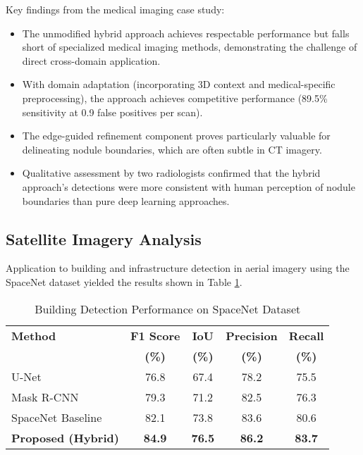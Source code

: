 Key findings from the medical imaging case study:

\begin{itemize}
    \item The unmodified hybrid approach achieves respectable performance but falls short of specialized medical imaging methods, demonstrating the challenge of direct cross-domain application.
    
    \item With domain adaptation (incorporating 3D context and medical-specific preprocessing), the approach achieves competitive performance (89.5\% sensitivity at 0.9 false positives per scan).
    
    \item The edge-guided refinement component proves particularly valuable for delineating nodule boundaries, which are often subtle in CT imagery.
    
    \item Qualitative assessment by two radiologists confirmed that the hybrid approach's detections were more consistent with human perception of nodule boundaries than pure deep learning approaches.
\end{itemize}

\subsection{Satellite Imagery Analysis}
Application to building and infrastructure detection in aerial imagery using the SpaceNet dataset yielded the results shown in Table \ref{tab:satellite_results}.

\begin{table}[h]
\centering
\caption{Building Detection Performance on SpaceNet Dataset}
\label{tab:satellite_results}
\begin{tabular}{lcccc}
\hline
\textbf{Method} & \textbf{F1 Score} & \textbf{IoU} & \textbf{Precision} & \textbf{Recall} \\
 & \textbf{(\%)} & \textbf{(\%)} & \textbf{(\%)} & \textbf{(\%)} \\
\hline
U-Net & 76.8 & 67.4 & 78.2 & 75.5 \\
Mask R-CNN & 79.3 & 71.2 & 82.5 & 76.3 \\
SpaceNet Baseline & 82.1 & 73.8 & 83.6 & 80.6 \\
\hline
\textbf{Proposed (Hybrid)} & \textbf{84.9} & \textbf{76.5} & \textbf{86.2} & \textbf{83.7} \\
\hline
\end{tabular}
\end{table}

